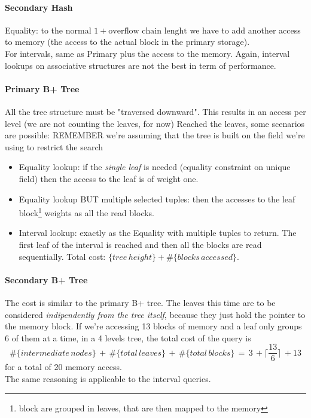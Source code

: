 \documentclass{article}
\begin{document}
				\paragraph{Secondary Hash}
					Equality: to the normal $1 + \text{overflow chain lenght}$ we have to add another access to memory (the access to the actual block in the primary storage).\\
					For intervals, same as Primary plus the access to the memory. Again, interval lookups on associative structures are not the best in term of performance.

				\paragraph{Primary B+ Tree}
					All the tree structure must be "traversed downward". This results in an access per level (we are not counting the leaves, for now)
					Reached the leaves, some scenarios are possible: REMEMBER we're assuming that the tree is built on the field we're using to restrict the search
					\begin{itemize}
						\item Equality lookup: if the \textit{single leaf} is needed (equality constraint on unique field) then the access to the leaf is of weight one.
						\item Equality lookup BUT multiple selected tuples: then the accesses to the leaf block\footnote{block are grouped in leaves, that are then mapped to the memory} weights as all the read blocks.
						\item Interval lookup: exactly as the Equality with multiple tuples to return. The first leaf of the interval is reached and then all the blocks are read sequentially. Total cost: $ \{tree\, height\} + \#\{blocks\, accessed\}$.
					\end{itemize}

				\paragraph{Secondary B+ Tree}
					The cost is similar to the primary B+ tree. The leaves this time are to be considered \textit{indipendently from the tree itself}, because they just hold the pointer to the memory block. If we're accessing 13 blocks of memory and a leaf only groups 6 of them at a time, in a 4 levels tree, the total cost of the query is
					\begin{equation}
						\#\{intermediate\, nodes\}\, +\, \#\{total\, leaves\}\, +\, \#\{total\, blocks\}\, =\, 3\, + \lceil\frac{13}{6}\rceil\, + 13
					\end{equation}
					for a total of 20 memory access.\\
					The same reasoning is applicable to the interval queries.
\end{document}
